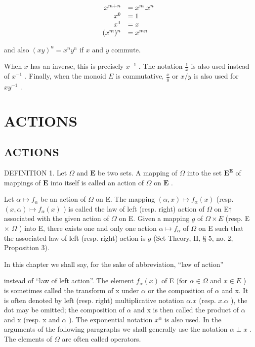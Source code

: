 \[
\begin{array}{r l} x ^ {m + n} & = x ^ {m}. x ^ {n} \\ x ^ {0} & = 1 \\ x ^ {1} & = x \\ (x ^ {m}) ^ {n} & = x ^ {m n} \end{array}
\]

and also \((xy)^n = x^n y^n\) if \(x\) and \(y\) commute.

When \(x\) has an inverse, this is precisely \(x^{-1}\) . The notation \(\frac{1}{x}\) is also used instead of \(x^{-1}\) . Finally, when the monoid \(E\) is commutative, \(\frac{x}{y}\) or \(x / y\) is also used for \(xy^{-1}\) .

\section{ACTIONS}

\subsection{ACTIONS}

DEFINITION 1. Let \(\Omega\) and \(\mathbf{E}\) be two sets. A mapping of \(\Omega\) into the set \(\mathbf{E}^{\mathbf{E}}\) of mappings of \(\mathbf{E}\) into itself is called an action of \(\Omega\) on \(\mathbf{E}\) .

Let \(\alpha \mapsto f_{\alpha}\) be an action of \(\Omega\) on E. The mapping \((\alpha, x) \mapsto f_{\alpha}(x)\) (resp. \((x, \alpha) \mapsto f_{\alpha}(x)\) ) is called the law of left (resp. right) action of \(\Omega\) on E† associated with the given action of \(\Omega\) on E. Given a mapping \(g\) of \(\Omega \times E\) (resp. E × \(\Omega\) ) into E, there exists one and only one action \(\alpha \mapsto f_{\alpha}\) of \(\Omega\) on E such that the associated law of left (resp. right) action is \(g\) (Set Theory, II, § 5, no. 2, Proposition 3).

In this chapter we shall say, for the sake of abbreviation, ``law of action''

instead of ``law of left action''. The element \(f_{\alpha}(x)\) of E (for \(\alpha \in \Omega\) and \(x \in E\) ) is sometimes called the transform of x under \(\alpha\) or the composition of \(\alpha\) and x. It is often denoted by left (resp. right) multiplicative notation \(\alpha.x\) (resp. \(x.\alpha\) ), the dot may be omitted; the composition of \(\alpha\) and x is then called the product of \(\alpha\) and x (resp. x and \(\alpha\) ). The exponential notation \(x^{\alpha}\) is also used. In the arguments of the following paragraphs we shall generally use the notation \(\alpha \perp x\) . The elements of \(\Omega\) are often called operators.

